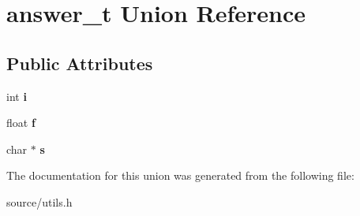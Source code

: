 \hypertarget{unionanswer__t}{}\section{answer\+\_\+t Union Reference}
\label{unionanswer__t}
\subsection*{Public Attributes}
\begin{DoxyCompactItemize}
\item 
int {\bfseries i}\hypertarget{unionanswer__t_a21d3d2b485a0dcf04e6ec6a60bb4d4db}{}\label{unionanswer__t_a21d3d2b485a0dcf04e6ec6a60bb4d4db}

\item 
float {\bfseries f}\hypertarget{unionanswer__t_acc96d348401060d8beea19445f9fe184}{}\label{unionanswer__t_acc96d348401060d8beea19445f9fe184}

\item 
char $\ast$ {\bfseries s}\hypertarget{unionanswer__t_a0de66e8519f97035ac10688155603648}{}\label{unionanswer__t_a0de66e8519f97035ac10688155603648}

\end{DoxyCompactItemize}


The documentation for this union was generated from the following file\+:\begin{DoxyCompactItemize}
\item 
source/utils.\+h\end{DoxyCompactItemize}
